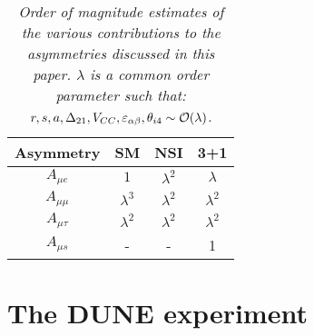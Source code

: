 \documentclass[12pt]{article}
\begin{document}
\begin{table}[]
\centering
\begin{tabular}{|c|c|c|c|}
\hline
\textbf{Asymmetry}   & \textbf{SM}  & \textbf{NSI}  & \textbf{3+1} \\ \hline
$A_{\mu e}$       &  $1$ & $\lambda^2$&  $\lambda$     \\ \hline
$A_{\mu \mu}$ & $\lambda^3$       & $\lambda^2$ & $\lambda^2$  \\ \hline
$A_{\mu \tau}$   & $\lambda^2$      &  $\lambda^2$ &  $\lambda^2$   \\ \hline
$A_{\mu s}$    & -    & - & 1      \\ \hline
\end{tabular}
\caption{\label{summary}\it  Order of magnitude estimates of the various contributions to the asymmetries discussed in this paper. $\lambda$ is a common order parameter such that: $r,s,a,\Delta_{21}, V_{CC}, \varepsilon_{\alpha\beta},\theta_{i4}\sim {\cal O} (\lambda)$.}
\end{table}



\section{The DUNE experiment}\label{DUNE}
\end{document}
